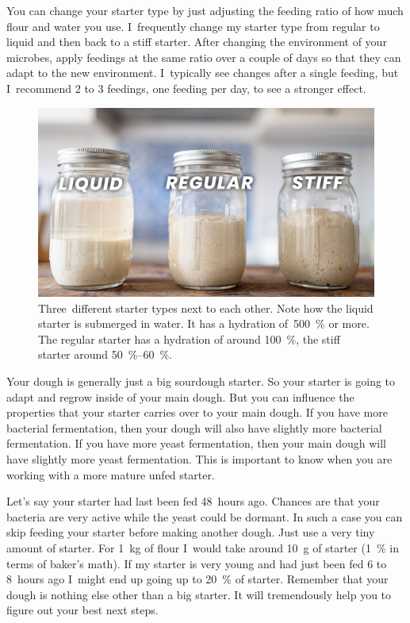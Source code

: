 You can change your starter type by just adjusting the feeding ratio of how
much flour and water you use. I~frequently change my starter type from
regular to liquid and then back to a stiff starter. After changing the
environment of your microbes, apply feedings at the same ratio over a couple of
days so that they can adapt to the new environment. I~typically see
changes after a single feeding, but I~recommend 2 to 3 feedings, one feeding per
day, to see a stronger effect.

\begin{figure}[!htb]
  \includegraphics[width=\textwidth]{sourdough-starter-types}
  \caption[Liquid, regular and stiff starter]{Three~different starter types
      next to each other. Note how the liquid starter is submerged in water.
      It has a hydration of~\qty{500}{\percent} or more.  The regular starter
      has a hydration of around \qty{100}{\percent}, the stiff starter around
      \qtyrange{50}{60}{\percent}.}%
  \label{fig:starter-types}
\end{figure}

Your dough is generally just a big sourdough starter. So your starter is going
to adapt and regrow inside of your main dough. But you can influence the
properties that your starter carries over to your main dough. If you have more
bacterial fermentation, then your dough will also have slightly more bacterial
fermentation. If you have more yeast fermentation, then your main dough will
have slightly more yeast fermentation. This is important to know when you are
working with a more mature unfed starter.

Let's say your starter had last been
fed 48~hours ago. Chances are that your bacteria are very active while the
yeast could be dormant. In such a case you can skip feeding your starter
before making another dough. Just use a very tiny amount of starter. For
\qty{1}{\kg} of flour I~would take around \qty{10}{\gram} of starter
(\qty{1}{\percent} in terms of baker's
math). If my starter is very young and had just been fed 6 to 8~hours ago I~might
end up going up to \qty{20}{\percent} of starter. Remember that your dough is nothing
else other than a big starter. It will tremendously help you to figure out
your best next steps.

